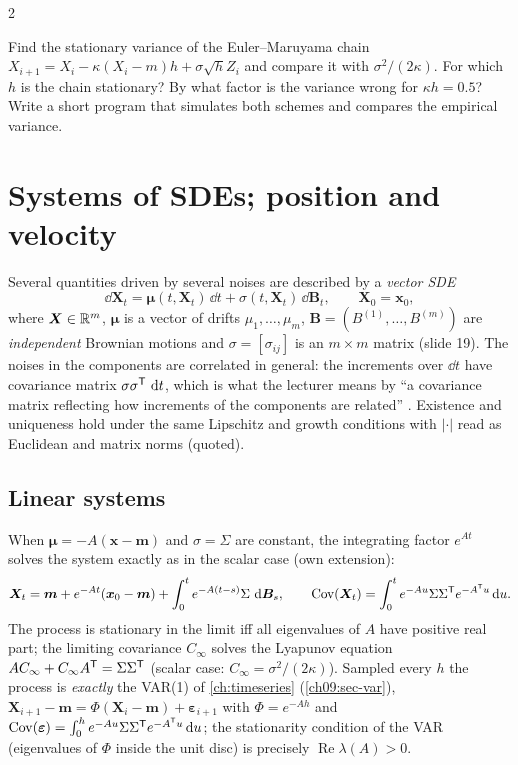 \begin{paracol}{2}
\begin{exercise}\label{ch18:ex-euler}
Find the stationary variance of the Euler--Maruyama chain $X_{i+1}=X_i-\kappa(X_i-m)h+\sigma\sqrt hZ_i$ and compare it with $\sigma^2/(2\kappa)$. For which $h$ is the chain stationary? By what factor is the variance wrong for $\kappa h=0.5$? Write a short program that simulates both schemes and compares the empirical variance.
\end{exercise}

\section{Systems of SDEs; position and velocity}\label{ch18:sec-sys}

Several quantities driven by several noises are described by a \emph{vector SDE} 
\begin{equation}\label{ch18:eq-vec}
  \dd\bm X_t=\bm\mu(t,\bm X_t)\,\dd t+\sigma(t,\bm X_t)\,\dd\bm B_t,\qquad\bm X_0=\bm x_0,
\end{equation}
where $\bm X\in\mathbb{R}^m$, $\bm\mu$ is a vector of drifts $\mu_1,\dots,\mu_m$, $\bm B=(B^{(1)},\dots,B^{(m)})$ are \emph{independent} Brownian motions and $\sigma=[\sigma_{ij}]$ is an $m\times m$ matrix (slide 19). The noises in the components are correlated in general: the increments over $\dd t$ have covariance matrix $\sigma\sigma^{\mathsf T}\,\,\mathrm{d} t$, which is what the lecturer means by ``a covariance matrix reflecting how increments of the components are related'' . Existence and uniqueness hold under the same Lipschitz and growth conditions with $|\cdot|$ read as Euclidean and matrix norms (quoted).

\subsection{Linear systems}
When $\bm\mu=-A(\bm x-\bm m)$ and $\sigma=\Sigma$ are constant, the integrating factor $e^{At}$ solves the system exactly as in the scalar case (own extension):
\begin{equation}\label{ch18:eq-vecou}
  \bm X_t=\bm m+e^{-At}(\bm x_0-\bm m)+\int_0^te^{-A(t-s)}\Sigma\,\,\mathrm{d}\bm B_s,\qquad
  \operatorname{Cov}(\bm X_t)=\int_0^te^{-Au}\Sigma\Sigma^{\mathsf T} e^{-A^{\mathsf T} u}\,\mathrm{d} u .
\end{equation}
The process is stationary in the limit iff all eigenvalues of $A$ have positive real part; the limiting covariance $C_\infty$ solves the Lyapunov equation $AC_\infty+C_\infty A^{\mathsf T}=\Sigma\Sigma^{\mathsf T}$ (scalar case: $C_\infty=\sigma^2/(2\kappa)$). Sampled every $h$ the process is \emph{exactly} the VAR(1) of \cref{ch:timeseries} (\cref{ch09:sec-var}), $\bm X_{i+1}-\bm m=\Phi(\bm X_i-\bm m)+\bm\varepsilon_{i+1}$ with $\Phi=e^{-Ah}$ and $\operatorname{Cov}(\bm\varepsilon)=\int_0^he^{-Au}\Sigma\Sigma^{\mathsf T} e^{-A^{\mathsf T} u}\,\mathrm{d} u$; the stationarity condition of the VAR (eigenvalues of $\Phi$ inside the unit disc) is precisely $\operatorname{Re}\lambda(A)>0$.


\end{paracol}
